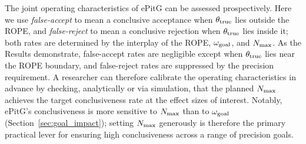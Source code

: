 The joint operating characteristics of ePitG can be assessed prospectively.
Here we use \textit{false-accept} to mean a conclusive acceptance when $\theta_{\rm true}$
lies outside the ROPE, and \textit{false-reject} to mean a conclusive rejection when
$\theta_{\rm true}$ lies inside it; both rates are determined by the interplay of the
ROPE, $\omega_{\rm goal}$, and $N_{\rm max}$.
As the Results demonstrate, false-accept rates are negligible except when
$\theta_{\rm true}$ lies near the ROPE boundary, and false-reject rates are
suppressed by the precision requirement.
A researcher can therefore calibrate the operating characteristics in advance
by checking, analytically or via simulation, that the planned $N_{\rm max}$
achieves the target conclusiveness rate at the effect sizes of interest.
Notably, ePitG's conclusiveness is more sensitive to $N_{\rm max}$ than to
$\omega_{\rm goal}$ (Section~\ref{sec:goal_impact}); setting $N_{\rm max}$
generously is therefore the primary practical lever for ensuring high
conclusiveness across a range of precision goals.

